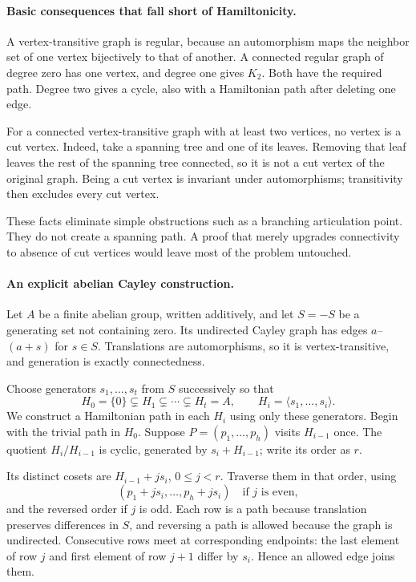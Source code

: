 \documentclass[11pt]{article}
\begin{document}
\paragraph{Basic consequences that fall short of Hamiltonicity.}
A vertex-transitive graph is regular, because an automorphism maps the neighbor set of one vertex bijectively to that of another. A connected regular graph of degree zero has one vertex, and degree one gives $K_2$. Both have the required path. Degree two gives a cycle, also with a Hamiltonian path after deleting one edge.

For a connected vertex-transitive graph with at least two vertices, no vertex is a cut vertex. Indeed, take a spanning tree and one of its leaves. Removing that leaf leaves the rest of the spanning tree connected, so it is not a cut vertex of the original graph. Being a cut vertex is invariant under automorphisms; transitivity then excludes every cut vertex.

These facts eliminate simple obstructions such as a branching articulation point. They do not create a spanning path. A proof that merely upgrades connectivity to absence of cut vertices would leave most of the problem untouched.

\paragraph{An explicit abelian Cayley construction.}
Let $A$ be a finite abelian group, written additively, and let $S=-S$ be a generating set not containing zero. Its undirected Cayley graph has edges $a$--$(a+s)$ for $s\in S$. Translations are automorphisms, so it is vertex-transitive, and generation is exactly connectedness.

Choose generators $s_1,\ldots,s_t$ from $S$ successively so that
\[
 H_0=\{0\}\subsetneq H_1\subsetneq\cdots\subsetneq H_t=A,
 \qquad H_i=\langle s_1,\ldots,s_i\rangle.
\]
We construct a Hamiltonian path in each $H_i$ using only these generators. Begin with the trivial path in $H_0$. Suppose
$P=(p_1,\ldots,p_h)$ visits $H_{i-1}$ once. The quotient
$H_i/H_{i-1}$ is cyclic, generated by $s_i+H_{i-1}$; write its order as $r$.

Its distinct cosets are $H_{i-1}+js_i$, $0\le j<r$. Traverse them in that order, using
\[
 (p_1+js_i,\ldots,p_h+js_i)\quad\text{if }j\text{ is even},
\]
and the reversed order if $j$ is odd. Each row is a path because translation preserves differences in $S$, and reversing a path is allowed because the graph is undirected. Consecutive rows meet at corresponding endpoints: the last element of row $j$ and first element of row $j+1$ differ by $s_i$. Hence an allowed edge joins them.
\end{document}
